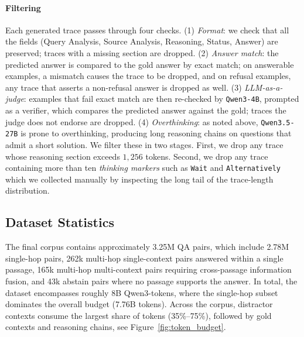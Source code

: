 \paragraph{Filtering}
Each generated trace passes through four checks. (1) \emph{Format}: we check that all the fields (Query Analysis, Source Analysis, Reasoning, Status, Answer) are preserved; traces with a missing section are dropped. (2) \emph{Answer match}: the predicted answer is compared to the gold answer by exact match; on answerable examples, a mismatch causes the trace to be dropped, and on refusal examples, any trace that asserts a non-refusal answer is dropped as well. (3) \emph{LLM-as-a-judge}: examples that fail exact match are then re-checked by \texttt{Qwen3-4B}, prompted as a verifier, which compares the predicted answer against the gold; traces the judge does not endorse are dropped. (4) \emph{Overthinking}: as noted above, \texttt{Qwen3.5-27B} is prone to overthinking, producing long reasoning chains on questions that admit a short solution. We filter these in two stages. First, we drop any trace whose reasoning section exceeds $1{,}256$ tokens. Second, we drop any trace containing more than ten \emph{thinking markers} such as \texttt{Wait} and \texttt{Alternatively} which we collected manually by inspecting the long tail of the trace-length distribution. 

\subsection{Dataset Statistics}
\label{sec:synth-sh-analysis}

The final corpus contains approximately 3.25M QA pairs, which include 2.78M single-hop pairs, 262k multi-hop single-context pairs answered within a single passage, 165k multi-hop multi-context pairs requiring cross-passage information fusion, and 43k abstain pairs where no passage supports the answer. In total, the dataset encompasses roughly 8B Qwen3-tokens, where the single-hop subset dominates the overall budget (7.76B tokens). Across the corpus, distractor contexts consume the largest share of tokens (35\%--75\%), followed by gold contexts and reasoning chains, see Figure~\ref{fig:token_budget}. 

